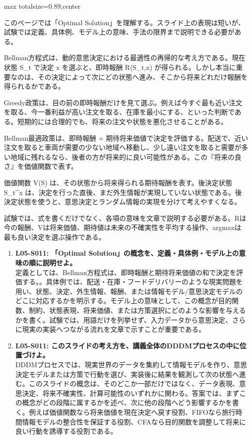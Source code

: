 \begin{minipage}[t]{0.58\textwidth}
\begin{adjustbox}{max totalsize={\textwidth}{0.89\textheight},center}
\begin{minipage}{\textwidth}\scriptsize
{}このページでは「Optimal Solution」を理解する。スライド上の表現は短いが、試験では定義、具体例、モデル上の意味、手法の限界まで説明できる必要がある。\par
Bellman方程式は、動的意思決定における最適性の再帰的な考え方である。現在状態 S\_t で決定 x を選ぶと、即時報酬 R(S\_t,x) が得られる。しかし本当に重要なのは、その決定によって次にどの状態へ進み、そこから将来どれだけ報酬を得られるかである。\par
Greedy政策は、目の前の即時報酬だけを見て選ぶ。例えば今すぐ最も近い注文を取る、今一番利益が高い注文を取る、在庫を最小にする、といった判断である。短期的には合理的でも、将来の注文や状態を悪化させることがある。\par
Bellman最適政策は、即時報酬 + 期待将来価値で決定を評価する。配送で、近い注文を取ると車両が需要の少ない地域へ移動し、少し遠い注文を取ると需要が多い地域に残れるなら、後者の方が将来的に良い可能性がある。この『将来の良さ』を価値関数で表す。\par
価値関数 V(S) は、その状態から将来得られる期待報酬を表す。後決定状態 S\_t\textasciicircum{}x は、決定を行った直後、まだ外生情報が実現していない状態である。後決定状態を使うと、意思決定とランダム情報の実現を分けて考えやすくなる。\par
試験では、式を書くだけでなく、各項の意味を文章で説明する必要がある。Rは今の報酬、Vは将来価値、期待値は未来の不確実性を平均する操作、argmaxは最も良い決定を選ぶ操作である。\par{}\begin{enumerate}\item \textbf{L05-S011: 「Optimal Solution」の概念を、定義・具体例・モデル上の意味の順に説明せよ。}\\定義としては、Bellman方程式は、即時報酬と期待将来価値の和で決定を評価する。。具体例では、配送・在庫・フードデリバリーのような現実問題を用い、状態、決定、外生情報、報酬、または情報モデル/意思決定モデルのどこに対応するかを明示する。モデル上の意味として、この概念が目的関数、制約、状態表現、将来価値、または方策選択にどのような影響を与えるかを書く。試験では、用語だけを列挙せず、入力データから意思決定、さらに現実の実装へつながる流れを文章で示すことが重要である。\item \textbf{L05-S011: このスライドの考え方を、講義全体のDDDMプロセスの中に位置づけよ。}\\DDDMプロセスでは、現実世界のデータを集約して情報モデルを作り、意思決定モデルまたは方策で行動を選び、実装後に結果を観測して次の状態へ進む。このスライドの概念は、そのどこか一部だけではなく、データ表現、意思決定、将来不確実性、計算可能性のいずれかに関わる。答案では、まずこの概念がどの段階に属するかを述べ、次に他の段階へどう影響するかを書く。例えば価値関数なら将来価値を現在決定へ戻す役割、FIFOなら旅行時間情報モデルの整合性を保証する役割、CFAなら目的関数を調整して将来に良い行動を誘導する役割である。\end{enumerate}

\end{minipage}
\end{adjustbox}
\end{minipage}
